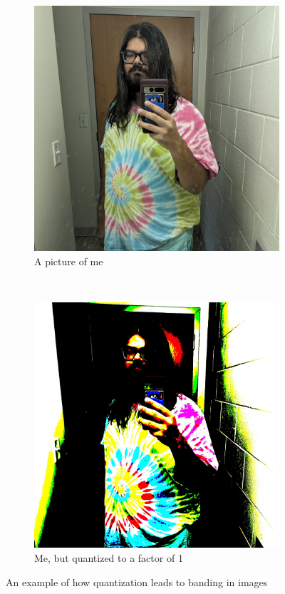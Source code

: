 \documentclass{article}
\begin{document}
\begin{figure}[H]
  \centering
  \begin{subfigure}[t]{0.35\textwidth}
    \centering
    \includegraphics[width=\textwidth]{images/me.jpg}
    \caption{A picture of me}
    \label{fig:me}
  \end{subfigure}
  ~
  \begin{subfigure}[t]{0.35\textwidth}
    \centering
    \includegraphics[width=\textwidth]{images/quantized_me.jpg}
    \caption{Me, but quantized to a factor of 1}
    \label{fig:me_quantized}
  \end{subfigure}
  \caption{An example of how quantization leads to banding in images}
\end{figure}
\end{document}

